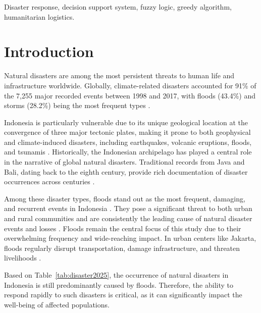 \documentclass[journal,final,a4paper,twoside,11pt]{IEEEtran}
\begin{document}
\begin{IEEEkeywords}
Disaster response,  decision support system, fuzzy logic, greedy algorithm, humanitarian logistics.
\end{IEEEkeywords}

\section{Introduction}

Natural disasters are among the most persistent threats to human life and infrastructure worldwide. Globally, climate-related disasters accounted for 91\% of the 7,255 major recorded events between 1998 and 2017, with floods (43.4\%) and storms (28.2\%) being the most frequent types \cite{teh2021types}. 

Indonesia is particularly vulnerable due to its unique geological location at the convergence of three major tectonic plates, making it prone to both geophysical and climate-induced disasters, including earthquakes, volcanic eruptions, floods, and tsunamis \cite{hakim2020review}. Historically, the Indonesian archipelago has played a central role in the narrative of global natural disasters. Traditional records from Java and Bali, dating back to the eighth century, provide rich documentation of disaster occurrences across centuries \cite{sastrawan2022portents}.

Among these disaster types, floods stand out as the most frequent, damaging, and recurrent events in Indonesia \cite{merten2021rising}. They pose a significant threat to both urban and rural communities and are consistently the leading cause of natural disaster events and losses \cite{jamshed2020conceptual}. Floods remain the central focus of this study due to their overwhelming frequency and wide-reaching impact. In urban centers like Jakarta, floods regularly disrupt transportation, damage infrastructure, and threaten livelihoods \cite{sholihah2020analysis}. 

Based on Table~\ref{tab:disaster2025}, the occurrence of natural disasters in Indonesia is still predominantly caused by floods. Therefore, the ability to respond rapidly to such disasters is critical, as it can significantly impact the well-being of affected populations.
\end{document}
